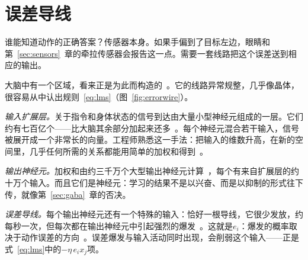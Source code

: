 \section{误差导线}

谁能知道动作的正确答案？传感器本身。如果手偏到了目标左边，眼睛和第~\ref{sec:sensors}~章的牵拉传感器会报告这一点。需要一套线路把这个误差送到相应的输出。

大脑中有一个区域，看来正是为此而构造的~\cite{Marr1969,Albus1971}。它的线路异常规整，几乎像晶体，很容易从中认出规则~\eqref{eq:lms}（图~\ref{fig:errorwire}）。

\emph{输入扩展层。}关于指令和身体状态的信号到达由大量小型神经元组成的一层。它们约有七百亿个——比大脑其余部分加起来还多~\cite{Azevedo2009}。每个神经元混合若干输入，信号被展开成一个非常长的向量。工程师熟悉这一手法：把输入的维数升高，在新的空间里，几乎任何所需的关系都能用简单的加权和得到~\cite{Cover1965}。

\emph{输出神经元。}加权和由约三千万个大型输出神经元计算~\cite{Andersen1992cereb}，每个有来自扩展层的约十万个输入。而且它们是神经元：学习的结果不是以兴奋、而是以抑制的形式往下传，就像第~\ref{sec:gaba}~章的否决。

\emph{误差导线。}每个输出神经元还有一个特殊的输入：恰好一根导线，它很少发放，约每秒一次，但每次都在输出神经元中引起强烈的爆发~\cite{Ito2001}。这就是$e_i$：爆发的概率取决于动作误差的方向~\cite{Herzfeld2018}。误差爆发与输入活动同时出现，会削弱这个输入——正是式~\eqref{eq:lms}中的$-\eta\,e_i x_j$项。

